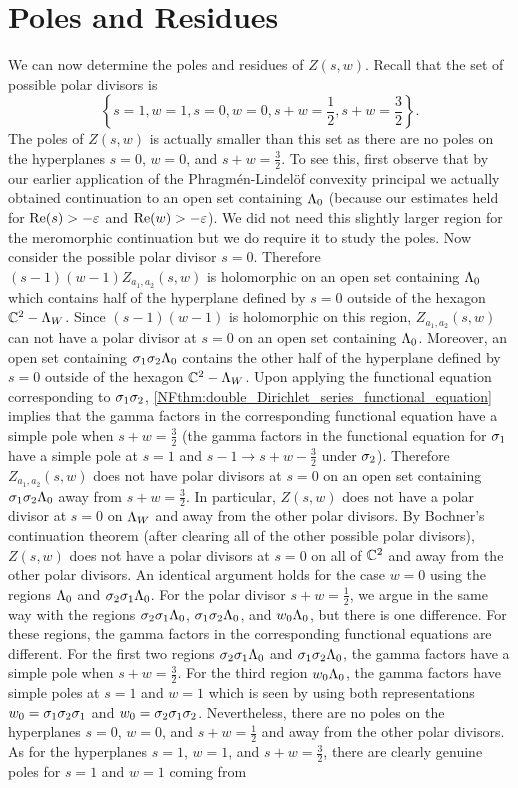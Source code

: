 \section{Poles and Residues}
    We can now determine the poles and residues of $Z(s,w)$. Recall that the set of possible polar divisors is
    \[
        \left\{s = 1, w = 1, s = 0, w = 0, s+w = \frac{1}{2}, s+w = \frac{3}{2}\right\}.
    \]
    The poles of $Z(s,w)$ is actually smaller than this set as there are no poles on the hyperplanes $s = 0$, $w = 0$, and $s+w = \frac{3}{2}$. To see this, first observe that by our earlier application of the Phragm\'en-Lindel\"of convexity principal we actually obtained continuation to an open set containing $\Lambda_{0}$ (because our estimates held for $\mathrm{Re}(s) > -\varepsilon$ and $\mathrm{Re}(w) > -\varepsilon$). We did not need this slightly larger region for the meromorphic continuation but we do require it to study the poles. Now consider the possible polar divisor $s = 0$. Therefore $(s-1)(w-1)Z_{a_{1},a_{2}}(s,w)$ is holomorphic on an open set containing $\Lambda_{0}$ which contains half of the hyperplane defined by $s = 0$ outside of the hexagon $\mathbb{C}^{2}-\Lambda_{W}$. Since $(s-1)(w-1)$ is holomorphic on this region, $Z_{a_{1},a_{2}}(s,w)$ can not have a polar divisor at $s = 0$ on an open set containing $\Lambda_{0}$. Moreover, an open set containing $\sigma_{1}\sigma_{2}\Lambda_{0}$ contains the other half of the hyperplane defined by $s = 0$ outside of the hexagon $\mathbb{C}^{2}-\Lambda_{W}$. Upon applying the functional equation corresponding to $\sigma_{1}\sigma_{2}$, \cref{NFthm:double_Dirichlet_series_functional_equation} implies that the gamma factors in the corresponding functional equation have a simple pole when $s+w = \frac{3}{2}$ (the gamma factors in the functional equation for $\sigma_{1}$ have a simple pole at $s = 1$ and $s-1 \to s+w-\frac{3}{2}$ under $\sigma_{2}$). Therefore $Z_{a_{1},a_{2}}(s,w)$ does not have polar divisors at $s = 0$ on an open set containing $\sigma_{1}\sigma_{2}\Lambda_{0}$ away from $s+w = \frac{3}{2}$. In particular, $Z(s,w)$ does not have a polar divisor at $s = 0$ on $\Lambda_{W}$ and away from the other polar divisors. By Bochner's continuation theorem (after clearing all of the other possible polar divisors), $Z(s,w)$ does not have a polar divisors at $s = 0$ on all of $\mathbb{C}^{2}$ and away from the other polar divisors. An identical argument holds for the case $w = 0$ using the regions $\Lambda_{0}$ and $\sigma_{2}\sigma_{1}\Lambda_{0}$. For the polar divisor $s+w = \frac{1}{2}$, we argue in the same way with the regions $\sigma_{2}\sigma_{1}\Lambda_{0}$, $\sigma_{1}\sigma_{2}\Lambda_{0}$, and $w_{0}\Lambda_{0}$, but there is one difference. For these regions, the gamma factors in the corresponding functional equations are different. For the first two regions $\sigma_{2}\sigma_{1}\Lambda_{0}$ and $\sigma_{1}\sigma_{2}\Lambda_{0}$, the gamma factors have a simple pole when $s+w = \frac{3}{2}$. For the third region $w_{0}\Lambda_{0}$, the gamma factors have simple poles at $s = 1$ and $w = 1$ which is seen by using both representations $w_{0} = \sigma_{1}\sigma_{2}\sigma_{1}$ and $w_{0} = \sigma_{2}\sigma_{1}\sigma_{2}$. Nevertheless, there are no poles on the hyperplanes $s = 0$, $w = 0$, and $s+w = \frac{1}{2}$ and away from the other polar divisors. As for the hyperplanes $s = 1$, $w = 1$, and $s+w = \frac{3}{2}$, there are clearly genuine poles for $s = 1$ and $w = 1$ coming from 